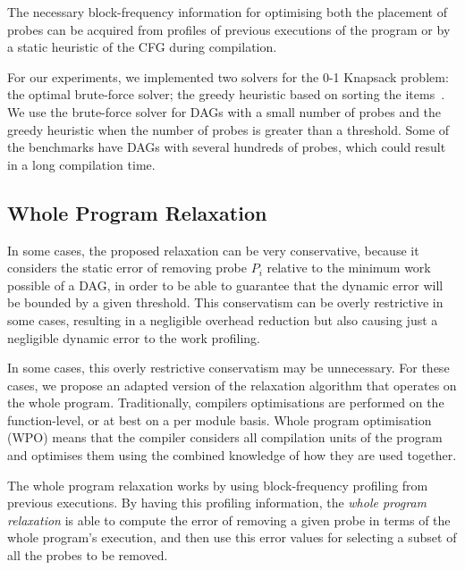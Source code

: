 \documentclass[sigplan,10pt]{acmart}
\theoremstyle{definition}
\begin{document}
The necessary block-frequency information for optimising both the placement of probes can be acquired from profiles of previous executions of the program or by a static heuristic of the CFG during compilation.

For our experiments, we implemented two solvers for the 0-1 Knapsack problem:
the optimal brute-force solver;
the greedy heuristic based on sorting the items~\citep{dantzig57}.
We use the brute-force solver for DAGs with a small number of probes and the greedy heuristic when the number of probes is greater than a threshold.
Some of the benchmarks have DAGs with several hundreds of probes, which could result in a long compilation time.

\subsection{Whole Program Relaxation}

In some cases, the proposed relaxation can be very conservative, because it considers the static error of removing probe $P_i$ relative to the minimum work possible of a DAG, in order to be able to guarantee that the dynamic error will be bounded by a given threshold.
This conservatism can be overly restrictive in some cases, resulting in a negligible overhead reduction but also causing just a negligible dynamic error to the work profiling.

In some cases, this overly restrictive conservatism may be unnecessary.
For these cases, we propose an adapted version of the relaxation algorithm that operates on the whole program.
Traditionally, compilers optimisations are performed on the function-level, or at best on a per module basis.
Whole program optimisation (WPO) means that the compiler considers all compilation units of the program and optimises them using the combined knowledge of how they are used together.

The whole program relaxation works by using block-frequency profiling from previous executions.
By having this profiling information, the \textit{whole program relaxation} is able to compute the error of removing a given probe in terms of the whole program's execution,
and then use this error values for selecting a subset of all the probes to be removed.
\end{document}
